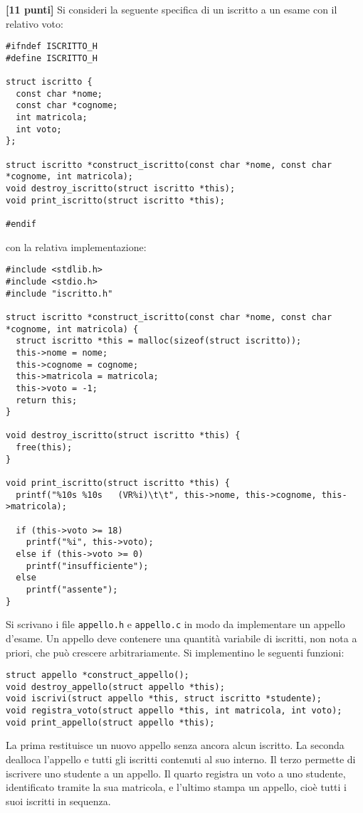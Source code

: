 \documentclass{article}[10pt]
\newcounter{esnu}
\newenvironment{esercizio}{\medskip \noindent {\bf Esercizio\addtocounter{esnu}{1} \arabic{esnu}}}{}
\begin{document}
\begin{esercizio}
\textbf{[11 punti]}
Si consideri la seguente specifica di un iscritto a un esame con il relativo voto:

{\small
\begin{verbatim}
#ifndef ISCRITTO_H
#define ISCRITTO_H

struct iscritto {
  const char *nome;
  const char *cognome;
  int matricola;
  int voto;
};

struct iscritto *construct_iscritto(const char *nome, const char *cognome, int matricola);
void destroy_iscritto(struct iscritto *this);
void print_iscritto(struct iscritto *this);

#endif
\end{verbatim}
}

\noindent
con la relativa implementazione:
%
{\small
\begin{verbatim}
#include <stdlib.h>
#include <stdio.h>
#include "iscritto.h"

struct iscritto *construct_iscritto(const char *nome, const char *cognome, int matricola) {
  struct iscritto *this = malloc(sizeof(struct iscritto));
  this->nome = nome;
  this->cognome = cognome;
  this->matricola = matricola;
  this->voto = -1;
  return this;
}

void destroy_iscritto(struct iscritto *this) {
  free(this);
}

void print_iscritto(struct iscritto *this) {
  printf("%10s %10s   (VR%i)\t\t", this->nome, this->cognome, this->matricola);

  if (this->voto >= 18)
    printf("%i", this->voto);
  else if (this->voto >= 0)
    printf("insufficiente");
  else
    printf("assente");
}
\end{verbatim}
}

Si scrivano i file \texttt{appello.h} e \texttt{appello.c} in modo da implementare un appello d'esame.
Un appello deve contenere una quantit\`a variabile di iscritti, non nota a priori, che pu\`o crescere
arbitrariamente. Si implementino le seguenti funzioni:
%
{\small
\begin{verbatim}
struct appello *construct_appello();
void destroy_appello(struct appello *this);
void iscrivi(struct appello *this, struct iscritto *studente);
void registra_voto(struct appello *this, int matricola, int voto);
void print_appello(struct appello *this);
\end{verbatim}
}

\noindent
La prima restituisce un nuovo appello senza ancora alcun iscritto. La seconda dealloca
l'appello e tutti gli iscritti contenuti al suo interno. Il terzo permette di iscrivere uno studente
a un appello. Il quarto registra un voto a uno studente, identificato tramite la sua matricola,
e l'ultimo stampa un appello, cio\`e tutti i suoi iscritti in sequenza.


\end{esercizio}
\end{document}
